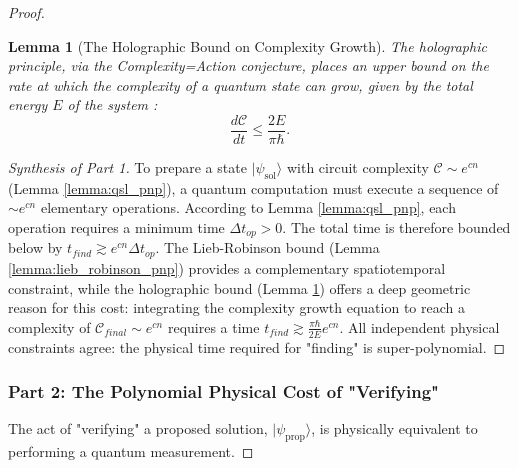 \documentclass[11pt, letterpaper]{report}
\theoremstyle{plain} %
\newtheorem{lemma}[theorem]{Lemma}
\theoremstyle{definition} %
\theoremstyle{remark} %
\begin{document}
\begin{proof}
\begin{lemma}[The Holographic Bound on Complexity Growth]
\label{lemma:holographic_complexity_pnp}
The holographic principle, via the Complexity=Action conjecture, places an upper bound on the rate at which the complexity of a quantum state can grow, given by the total energy $E$ of the system \cite{BrownEtAl2016Action}:
\begin{equation}
    \frac{d\mathcal{C}}{dt} \le \frac{2E}{\pi\hbar}.
\end{equation}
\end{lemma}
\begin{proof}[Synthesis of Part 1]
To prepare a state $|\psi_{\text{sol}}\rangle$ with circuit complexity $\mathcal{C} \sim e^{cn}$ (Lemma \ref{lemma:qsl_pnp}), a quantum computation must execute a sequence of $\sim e^{cn}$ elementary operations. According to Lemma \ref{lemma:qsl_pnp}, each operation requires a minimum time $\Delta t_{op} > 0$. The total time is therefore bounded below by $t_{find} \gtrsim e^{cn} \Delta t_{op}$. The Lieb-Robinson bound (Lemma \ref{lemma:lieb_robinson_pnp}) provides a complementary spatiotemporal constraint, while the holographic bound (Lemma \ref{lemma:holographic_complexity_pnp}) offers a deep geometric reason for this cost: integrating the complexity growth equation to reach a complexity of $\mathcal{C}_{final} \sim e^{cn}$ requires a time $t_{find} \gtrsim \frac{\pi\hbar}{2E}e^{cn}$. All independent physical constraints agree: the physical time required for "finding" is super-polynomial.
\end{proof}

\subsubsection*{Part 2: The Polynomial Physical Cost of "Verifying"}

The act of "verifying" a proposed solution, $|\psi_{\text{prop}}\rangle$, is physically equivalent to performing a quantum measurement.


\end{proof}
\end{document}
